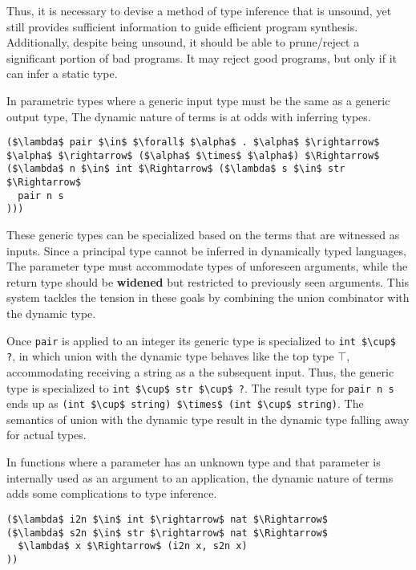 \documentclass[sigplan,screen]{acmart}
\begin{document}
Thus, it is necessary to devise a method of type inference that is unsound, 
yet still provides sufficient information to guide efficient program synthesis.
Additionally, despite being unsound, it should be able to prune/reject 
a significant portion of bad programs. 
It may reject good programs, but only if it can infer a static type.

In parametric types where a generic input type must be the same as a generic output type,
The dynamic nature of terms is at odds with inferring types.

\begin{lstlisting}
($\lambda$ pair $\in$ $\forall$ $\alpha$ . $\alpha$ $\rightarrow$ $\alpha$ $\rightarrow$ ($\alpha$ $\times$ $\alpha$) $\Rightarrow$ 
($\lambda$ n $\in$ int $\Rightarrow$ ($\lambda$ s $\in$ str $\Rightarrow$ 
  pair n s
)))
\end{lstlisting}

\noindent These generic types can be specialized based on the terms that are witnessed as inputs. 
Since a principal type cannot be inferred in dynamically typed languages, 
The parameter type must accommodate types of unforeseen arguments, 
while the return type should be \textbf{widened} but restricted 
to previously seen arguments.
This system tackles the tension in these goals by combining the union combinator  
with the dynamic type. 

Once \lstinline{pair} is applied to an integer its generic type is specialized to 
\lstinline{int $\cup$ ?}, 
in which union with the dynamic type behaves like the top type $\top$, 
accommodating receiving a string as a the subsequent input.
Thus, the generic type is specialized to \lstinline{int $\cup$ str $\cup$ ?}.
The result type for \lstinline{pair n s} ends up as 
\lstinline{(int $\cup$ string) $\times$ (int $\cup$ string)}. 
The semantics of union with the dynamic type result in the dynamic type 
falling away for actual types.

In functions where a parameter has an unknown type and that parameter is 
internally used as an argument to an application, the dynamic nature of terms  
adds some complications to type inference.

\begin{lstlisting}
($\lambda$ i2n $\in$ int $\rightarrow$ nat $\Rightarrow$ 
($\lambda$ s2n $\in$ str $\rightarrow$ nat $\Rightarrow$ 
  $\lambda$ x $\Rightarrow$ (i2n x, s2n x)
))

\end{lstlisting}
\end{document}

